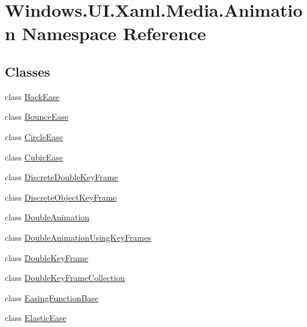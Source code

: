 \hypertarget{namespace_windows_1_1_u_i_1_1_xaml_1_1_media_1_1_animation}{}\section{Windows.\+U\+I.\+Xaml.\+Media.\+Animation Namespace Reference}
\label{namespace_windows_1_1_u_i_1_1_xaml_1_1_media_1_1_animation}
\subsection*{Classes}
\begin{DoxyCompactItemize}
\item 
class \hyperlink{class_windows_1_1_u_i_1_1_xaml_1_1_media_1_1_animation_1_1_back_ease}{Back\+Ease}
\item 
class \hyperlink{class_windows_1_1_u_i_1_1_xaml_1_1_media_1_1_animation_1_1_bounce_ease}{Bounce\+Ease}
\item 
class \hyperlink{class_windows_1_1_u_i_1_1_xaml_1_1_media_1_1_animation_1_1_circle_ease}{Circle\+Ease}
\item 
class \hyperlink{class_windows_1_1_u_i_1_1_xaml_1_1_media_1_1_animation_1_1_cubic_ease}{Cubic\+Ease}
\item 
class \hyperlink{class_windows_1_1_u_i_1_1_xaml_1_1_media_1_1_animation_1_1_discrete_double_key_frame}{Discrete\+Double\+Key\+Frame}
\item 
class \hyperlink{class_windows_1_1_u_i_1_1_xaml_1_1_media_1_1_animation_1_1_discrete_object_key_frame}{Discrete\+Object\+Key\+Frame}
\item 
class \hyperlink{class_windows_1_1_u_i_1_1_xaml_1_1_media_1_1_animation_1_1_double_animation}{Double\+Animation}
\item 
class \hyperlink{class_windows_1_1_u_i_1_1_xaml_1_1_media_1_1_animation_1_1_double_animation_using_key_frames}{Double\+Animation\+Using\+Key\+Frames}
\item 
class \hyperlink{class_windows_1_1_u_i_1_1_xaml_1_1_media_1_1_animation_1_1_double_key_frame}{Double\+Key\+Frame}
\item 
class \hyperlink{class_windows_1_1_u_i_1_1_xaml_1_1_media_1_1_animation_1_1_double_key_frame_collection}{Double\+Key\+Frame\+Collection}
\item 
class \hyperlink{class_windows_1_1_u_i_1_1_xaml_1_1_media_1_1_animation_1_1_easing_function_base}{Easing\+Function\+Base}
\item 
class \hyperlink{class_windows_1_1_u_i_1_1_xaml_1_1_media_1_1_animation_1_1_elastic_ease}{Elastic\+Ease}

\end{DoxyCompactItemize}
